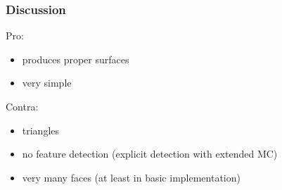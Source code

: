 \subsubsection{Discussion}
Pro:
\begin{itemize}
\item produces proper  surfaces
\item very simple
\end{itemize}
Contra:
\begin{itemize}
\item triangles
\item no feature detection (explicit detection with extended MC)
\item very many faces (at least in basic implementation)
\end{itemize}